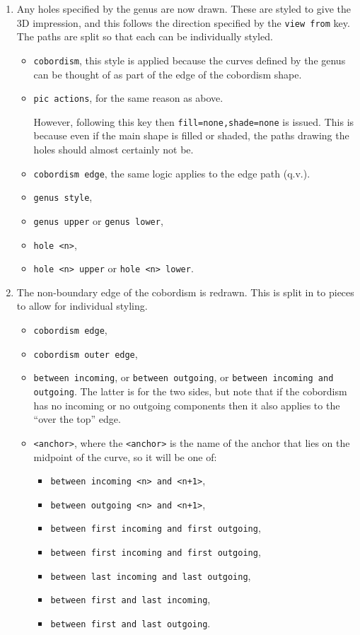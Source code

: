 \documentclass{ltxdoc}
\begin{document}
\begin{enumerate}
\item Any holes specified by the genus are now drawn.
These are styled to give the 3D impression, and this follows the direction specified by the \Verb+view from+ key.
The paths are split so that each can be individually styled.

\begin{itemize}
\item \Verb+cobordism+, this style is applied because the curves defined by the genus can be thought of as part of the edge of the cobordism shape.
\item \Verb+pic actions+, for the same reason as above.

However, following this key then \Verb+fill=none,shade=none+ is issued.
This is because even if the main shape is filled or shaded, the paths drawing the holes should almost certainly not be.
\item \Verb+cobordism edge+, the same logic applies to the edge path (q.v.).
\item \Verb+genus style+,
\item \Verb+genus upper+ or \Verb+genus lower+,
\item \Verb+hole <n>+,
\item \Verb+hole <n> upper+ or \Verb+hole <n> lower+.
\end{itemize}

\item The non-boundary edge of the cobordism is redrawn.
This is split in to pieces to allow for individual styling.

\begin{itemize}
\item \Verb+cobordism edge+,
\item \Verb+cobordism outer edge+,
\item \Verb+between incoming+, or \Verb+between outgoing+, or \Verb+between incoming and outgoing+.
The latter is for the two sides, but note that if the cobordism has no incoming or no outgoing components then it also applies to the ``over the top'' edge.
\item \Verb+<anchor>+, where the \Verb+<anchor>+ is the name of the anchor that lies on the midpoint of the curve, so it will be one of:
%
\begin{itemize}
\item \Verb=between incoming <n> and <n+1>=,
\item \Verb=between outgoing <n> and <n+1>=,
\item \Verb+between first incoming and first outgoing+,
\item \Verb+between first incoming and first outgoing+,
\item \Verb+between last incoming and last outgoing+,
\item \Verb+between first and last incoming+,
\item \Verb+between first and last outgoing+.
\end{itemize}
\end{itemize}


\end{enumerate}
\end{document}
